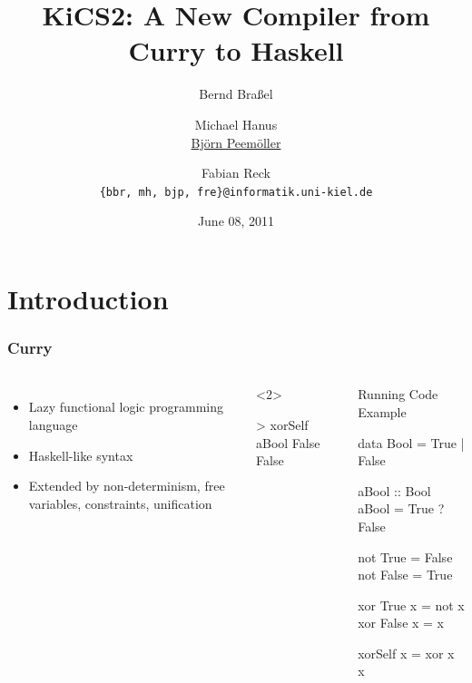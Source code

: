 \documentclass[utf8]{beamer}
\newenvironment{program}{\begin{semiverbatim}\small}{\end{semiverbatim}}
\begin{document}
\title[KiCS2]{KiCS2: A New Compiler from Curry to Haskell}

\date{June 08, 2011}

\author[B. Braßel, M. Hanus, \underline{B. Peemöller}, F. Reck]
 {Bernd Braßel \and Michael Hanus \\
   \underline{Björn Peemöller} \and Fabian Reck\\
  \texttt{\{bbr, mh, bjp, fre\}@informatik.uni-kiel.de}}


\begin{frame}
\titlepage
\end{frame}

\section{Introduction}

\begin{frame}[fragile]
\frametitle{Curry}
\begin{columns}[t]
\begin{itemize}
\item Lazy functional logic programming language
\item Haskell-like syntax
\item Extended by non-determinism, free variables, constraints, unification
\end{itemize}
\begin{example}<2>
\begin{program}
> xorSelf aBool
False
False
\end{program}
\end{example}
\begin{block}{Running Code Example}
\begin{program}
data Bool = True | False

aBool :: Bool
aBool = True ? False

not True  = False
not False = True

xor True  x = not x
xor False x = x

xorSelf x = xor x x
\end{program}
\end{block}
\end{columns}
\end{frame}
\end{document}

